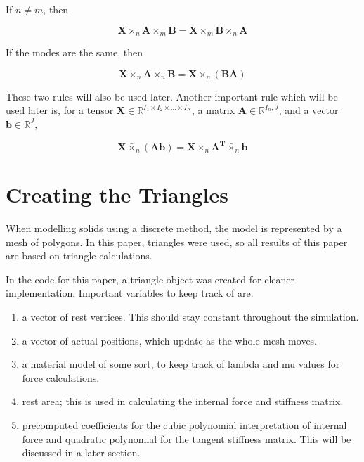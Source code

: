 \documentclass[twocolumn,10pt]{asme2ej}
\begin{document}
If $n \neq m$, then

\begin{equation}
\bm{X} \times_n \bm{A} \times_m  \bm{B} = \bm{X} \times_m \bm{B} \times_n \bm{A}
\label{eq_matrixModeCommute}
\end{equation}

If the modes are the same, then

\begin{equation}
\bm{X} \times_n \bm{A} \times_n  \bm{B} = \bm{X} \times_n (\bm{BA})
\label{eq_matrixModeAssociate}
\end{equation}

These two rules will also be used later. Another important rule which will be used later is, for  a tensor $\bm{X} \in \mathbb{R}^{I_1 \times I_2 \times ... \times I_N}$, a matrix $\bm{A} \in \mathbb{R}^{I_n, J}$, and a vector $\bm{b} \in \mathbb{R}^{J}$,

\begin{equation}
\bm{X} \bar{\times}_n (\bm{Ab}) = \bm{X} \times_n \bm{A^T} \bar{\times}_n \bm{b}
\label{eq_productDecompose}
\end{equation}

\section{Creating the Triangles}

When modelling solids using a discrete method, the model is represented by a mesh of polygons. In this paper, triangles were
used, so all results of this paper are based on triangle calculations.

In the code for this paper, a triangle object was created for cleaner implementation. Important variables to keep track of are:
\begin{enumerate}
  \item a vector of rest vertices. This should stay constant throughout the simulation.
  \item a vector of actual positions, which update as the whole mesh moves.
  \item a material model of some sort, to keep track of lambda and mu values for force calculations.
  \item rest area; this is used in calculating the internal force and stiffness matrix.
  \item precomputed coefficients for the cubic polynomial interpretation of internal force and quadratic polynomial
  for the tangent stiffness matrix. This will be discussed in a later section.
\end{enumerate}
\end{document}

